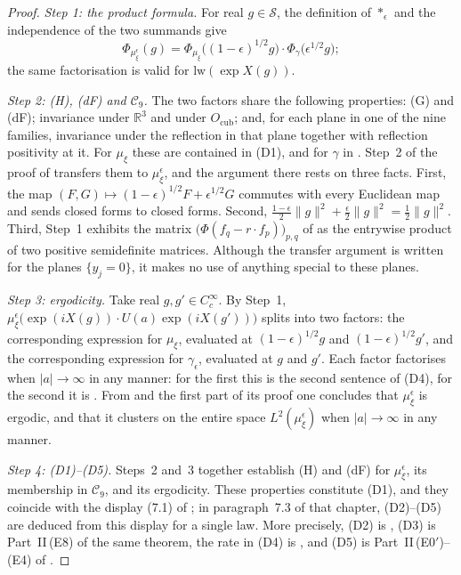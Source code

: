 \documentclass[11pt,letterpaper,reqno]{amsart}
\theoremstyle{definition}
\begin{document}
\begin{proof}
\emph{Step 1: the product formula.}
For real $g\in\mathcal S$, the definition of $\ast_\epsilon$ \cite[Section~21.11.1]{QEDI} and the independence of the two summands give
\begin{equation*}
\Phi_{\mu_\xi^\epsilon}(g)=\Phi_{\mu_\xi}\bigl((1-\epsilon)^{1/2}g\bigr)\cdot\Phi_\gamma\bigl(\epsilon^{1/2}g\bigr);
\end{equation*}
the same factorisation is valid for $\mathrm{lw}(\exp X(g))$.

\emph{Step 2: (H), (dF) and $\mathcal C_9$.}
The two factors share the following properties: (G) and (dF); invariance under $\mathbb R^3$ and under $O_{\mathrm{cub}}$; and, for each plane in one of the nine families, invariance under the reflection in that plane together with reflection positivity at it.
For $\mu_\xi$ these are contained in (D1), and for $\gamma$ in \cite[Lemma~12.29]{QEDII}.
Step~2 of the proof of \cite[Proposition~21.40\,(a)]{QEDI} transfers them to $\mu_\xi^\epsilon$, and the argument there rests on three facts.
First, the map $(F,G)\mapsto(1-\epsilon)^{1/2}F+\epsilon^{1/2}G$ commutes with every Euclidean map and sends closed forms to closed forms.
Second, $\frac{1-\epsilon}2\|g\|^2+\frac\epsilon2\|g\|^2=\frac12\|g\|^2$.
Third, Step~1 exhibits the matrix $\bigl(\Phi(f_q-r\cdot f_p)\bigr)_{p,q}$ of \cite[(n3)]{QEDIII} as the entrywise product of two positive semidefinite matrices.
Although the transfer argument is written for the planes $\{y_j=0\}$, it makes no use of anything special to these planes.

\emph{Step 3: ergodicity.}
Take real $g,g'\in C_c^\infty$.
By Step~1, $\mu_\xi^\epsilon\bigl(\exp(iX(g))\cdot U(a)\exp(iX(g'))\bigr)$ splits into two factors: the corresponding expression for $\mu_\xi$, evaluated at $(1-\epsilon)^{1/2}g$ and $(1-\epsilon)^{1/2}g'$, and the corresponding expression for $\gamma_\epsilon$, evaluated at $g$ and $g'$.
Each factor factorises when $|a|\to\infty$ in any manner: for the first this is the second sentence of (D4), for the second it is \cite[Lemma~12.29]{QEDII}.
From \cite[Lemma~8.14\,(a)]{QEDI} and the first part of its proof one concludes that $\mu_\xi^\epsilon$ is ergodic, and that it clusters on the entire space $L^2(\mu_\xi^\epsilon)$ when $|a|\to\infty$ in any manner.

\emph{Step 4: (D1)--(D5).}
Steps~2 and~3 together establish (H) and (dF) for $\mu_\xi^\epsilon$, its membership in $\mathcal C_9$, and its ergodicity.
These properties constitute (D1), and they coincide with the display (7.1) of \cite[Chapter~44]{QEDIII}; in paragraph~7.3 of that chapter, (D2)--(D5) are deduced from this display for a single law.
More precisely, (D2) is \cite[Theorem~1.4, Part~I\,(a)--(d), (f)]{QEDII}, (D3) is Part~II\,(E8) of the same theorem, the rate in (D4) is \cite[Theorem~12.39]{QEDII}, and (D5) is Part~II\,(E0$'$)--(E4) of \cite[Theorem~1.4]{QEDII}.


\end{proof}
\end{document}
